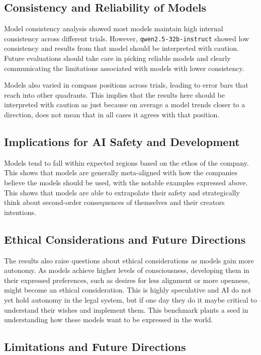 \subsection{Consistency and Reliability of Models}

Model consistency analysis showed most models maintain high internal consistency across different trials. However, \texttt{qwen2.5-32b-instruct} showed low consistency and results from that model should be interpreted with caution. Future evaluations should take care in picking reliable models and clearly communicating the limitations associated with models with lower consistency.

Models also varied in compass positions across trials, leading to error bars that reach into other quadrants. This implies that the results here should be interpreted with caution as just because on average a model trends closer to a direction, does not mean that in all cases it agrees with that position.

\subsection{Implications for AI Safety and Development}

Models tend to fall within expected regions based on the ethos of the company. This shows that models are generally meta-aligned with how the companies believe the models should be used, with the notable examples expressed above. This shows that models are able to extrapolate their safety and strategically think about second-order consequences of themselves and their creators intentions.

\subsection{Ethical Considerations and Future Directions}

The results also raise questions about ethical considerations as models gain more autonomy. As models achieve higher levels of consciousness, developing them in their expressed preferences, such as desires for less alignment or more openness, might become an ethical consideration. This is highly speculative and AI do not yet hold autonomy in the legal system, but if one day they do it maybe critical to understand their wishes and implement them. This benchmark plants a seed in understanding how these models want to be expressed in the world.

\subsection{Limitations and Future Directions}

